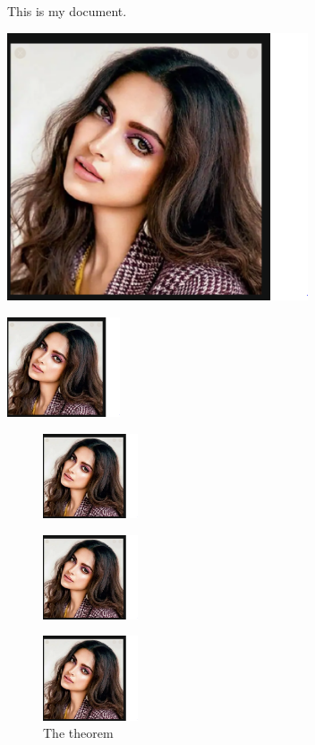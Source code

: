 \documentclass[12pt,a4paper]{article}
\begin{document}
This is my document.

\includegraphics[width=3.5in]{deepulook}
\begin{center}
\includegraphics[scale=0.2,width=0.25\textwidth]{deepulook}
\end{center}
\begin{figure}
\includegraphics[scale=0.2,width=0.25\textwidth]{deepulook}
\end{figure}
\begin{figure}[h]
\includegraphics[scale=0.2,width=0.25\textwidth]{deepulook}
\end{figure}
\begin{figure}[H]
\centering
\includegraphics[scale=0.2,width=0.25\textwidth]{deepulook}
\caption{The theorem}
\end{figure}
\end{document}
